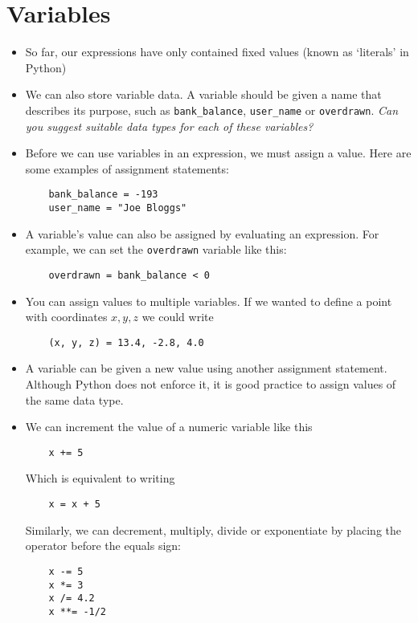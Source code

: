 \documentclass[a4paper,twoside]{memoir}
\newcommand{\shellcmd}{\texttt}
\begin{document}
\section{Variables}
\begin{itemize}
	\item So far, our expressions have only contained fixed values (known as `literals' in Python)
	\item We can also store variable data.  A variable should be given a name that describes its purpose, such as \shellcmd{bank\_balance}, \shellcmd{user\_name} or \shellcmd{overdrawn}.  \textit{Can you suggest suitable data types for each of these variables?}
	\item Before we can use variables in an expression, we must assign a value.  Here are some examples of assignment statements:
\begin{verbatim}
	bank_balance = -193
	user_name = "Joe Bloggs"
\end{verbatim}
	\item A variable's value can also be assigned by evaluating an expression.  For example, we can set the \shellcmd{overdrawn} variable like this:
\begin{verbatim}
	overdrawn = bank_balance < 0
\end{verbatim}
	\item You can assign values to multiple variables.  If we wanted to define a point with coordinates $x, y, z$ we could write
\begin{verbatim}
	(x, y, z) = 13.4, -2.8, 4.0
\end{verbatim}
	\item A variable can be given a new value using another assignment statement.  Although Python does not enforce it, it is good practice to assign values of the same data type.
	\item We can increment the value of a numeric variable like this
\begin{verbatim}
	x += 5
\end{verbatim}
Which is equivalent to writing
\begin{verbatim}
	x = x + 5
\end{verbatim}
Similarly, we can decrement, multiply, divide or exponentiate by placing the operator before the equals sign:
\begin{verbatim}
	x -= 5
	x *= 3
	x /= 4.2
	x **= -1/2
\end{verbatim}
\end{itemize}
\end{document}
